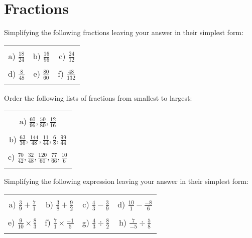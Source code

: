 \documentclass[12pt]{article}
\begin{document}
\section{Fractions}
Simplifying the following fractions leaving your answer in their simplest form:
\begin{table}[h!]
\centering
\begin{tabular}{c c c}
\hspace{2cm} & \hspace{6cm} & \hspace{4cm}\\
a) $\frac{18}{24}$ & b) $\frac{16}{96}$ & c) $\frac{24}{12}$\\ \\
d) $\frac{8}{48}$ & e) $\frac{80}{60}$ & f) $\frac{48}{132}$\\ \\
\end{tabular}
\end{table}
\newline
Order the following lists of fractions from smallest to largest:
\begin{table}[h!]
\centering
\begin{tabular}{c}
\hspace{4cm}\\
a) $\frac{60}{96}, \frac{50}{80}, \frac{12}{16}$\\ \\
b) $\frac{63}{36}, \frac{144}{48}, \frac{11}{44}, \frac{6}{8}, \frac{99}{44}$\\ \\
c) $\frac{70}{42}, \frac{32}{48}, \frac{120}{60}, \frac{77}{66}, \frac{10}{6}$\\ \\
\end{tabular}
\end{table}
\newline
Simplifying the following expression leaving your answer in their simplest form:
\begin{table}[h!]
\centering
\begin{tabular}{c c c c}
\hspace{4cm} & \hspace{4cm} & \hspace{4cm} & \hspace{4cm}\\
a) $\frac{{3}}{{9}} + \frac{{7}}{{1}}$ & b) $\frac{{3}}{{8}} + \frac{{9}}{{2}}$ & c) $\frac{{4}}{{3}} - \frac{{3}}{{9}}$ & d) $\frac{{10}}{{1}} - \frac{{-8}}{{6}}$ \\ \\
e) $\frac{{9}}{{10}}\times\frac{{8}}{{3}}$ & f) $\frac{{7}}{{1}}\times\frac{{-1}}{{5}}$ & g) $\frac{{4}}{{3}}\div\frac{{8}}{{2}}$ & h) $\frac{{7}}{{-5}}\div\frac{{5}}{{8}}$ \\ \\
\end{tabular}
\end{table}
\newline
\newpage
\end{document}
